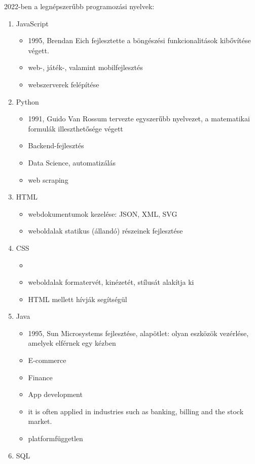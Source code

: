 \documentclass[tocnopagenum]{thesis-ekf}
\theoremstyle{definition}
\theoremstyle{remark}
\begin{document}
	2022-ben a legnépszerűbb programozási nyelvek:
	\begin{enumerate}
		\item JavaScript
		\begin{itemize}
			\item 1995, Brendan Eich fejlesztette a böngészési funkcionalitások kibővítése végett.
			\item web-, játék-, valamint mobilfejlesztés
			\item webszerverek felépítése
		\end{itemize}
		\item Python
		\begin{itemize}
			\item 1991, Guido Van Rossum tervezte egyszerűbb nyelvezet, a matematikai formulák illeszthetősége végett
			\item Backend-fejlesztés
			\item Data Science, automatizálás
			\item web scraping
		\end{itemize}
		\item HTML %
		\begin{itemize}
			\item webdokumentumok kezelése: JSON, XML, SVG
			\item weboldalak statikus (állandó) részeinek fejlesztése
		\end{itemize}
		\item CSS %
		\begin{itemize}
			\item 
			\item weboldalak formatervét, kinézetét, stílusát alakítja ki
			\item HTML mellett hívják segítségül
		\end{itemize}
		\item Java
		\begin{itemize}
			\item 1995, Sun Microsystems fejlesztése, alapötlet: olyan eszközök vezérlése, amelyek elférnek egy kézben
			\item E-commerce
			\item Finance
			\item App development
			\item it is often applied in industries such as banking, billing and the stock market.
			\item platformfüggetlen
		\end{itemize}
		\item SQL

\end{enumerate}
\end{document}
